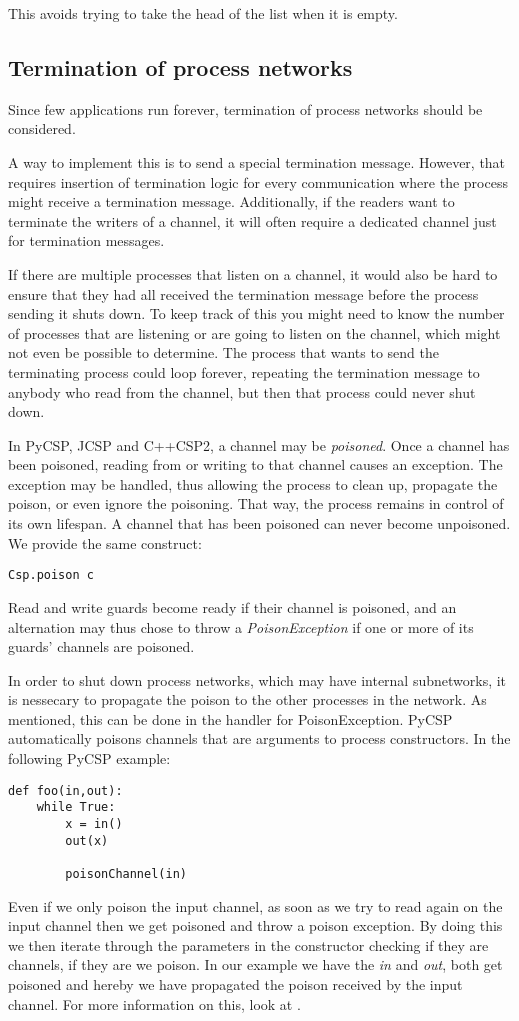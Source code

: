 \documentclass[a4paper,12pt]{article}
\begin{document}
This avoids trying to take the head of the list when it is empty.

\subsection{Termination of process networks}
Since few applications run forever, termination of process networks should be
considered.

A way to implement this is to send a special termination message. However,
that requires insertion of termination logic for every communication where the
process might receive a termination message. Additionally, if the readers want
to terminate the writers of a channel, it will often require a dedicated channel
just for termination messages.

If there are multiple processes that listen on a channel, it would also be hard
to ensure that they had all received the termination message before the process
sending it shuts down. To keep track of this you might need to know the number
of processes that are listening or are going to listen on the channel, which
might not even be possible to determine. The process that wants to send the
terminating process could loop forever, repeating the termination message to
anybody who read from the channel, but then that process could never shut down.

In PyCSP, JCSP and C++CSP2, a channel may be \emph{poisoned}. Once a channel
has been poisoned, reading from or writing to that channel causes an exception.
The exception may be handled, thus allowing the process to clean up, propagate
the poison, or even ignore the poisoning. That way, the process remains in
control of its own lifespan. A channel that has been poisoned can never become
unpoisoned. We provide the same construct:

\begin{verbatim}
Csp.poison c 
\end{verbatim}

Read and write guards become ready if their channel is poisoned, and an
alternation may thus chose to throw a \emph{PoisonException} if one or more of
its guards' channels are poisoned.

In order to shut down process networks, which may have internal subnetworks, it
is nessecary to propagate the poison to the other processes in the network. As
mentioned, this can be done in the handler for PoisonException. PyCSP
automatically poisons channels that are arguments to process constructors. In 
the following PyCSP example:
\begin{verbatim}
def foo(in,out):
    while True:
        x = in()
        out(x)
        
        poisonChannel(in)
\end{verbatim}
Even if we only poison the input channel, as soon as we try to read again on
the input channel then we get poisoned and throw a poison exception. By doing
this we then iterate through the parameters in the constructor checking if
they are channels, if they are we poison. In our example we have the {\it in}
and {\it out}, both get poisoned and hereby we have propagated the poison
received by the input channel. For more information on this, look at
\cite{pycsp}.
\end{document}
